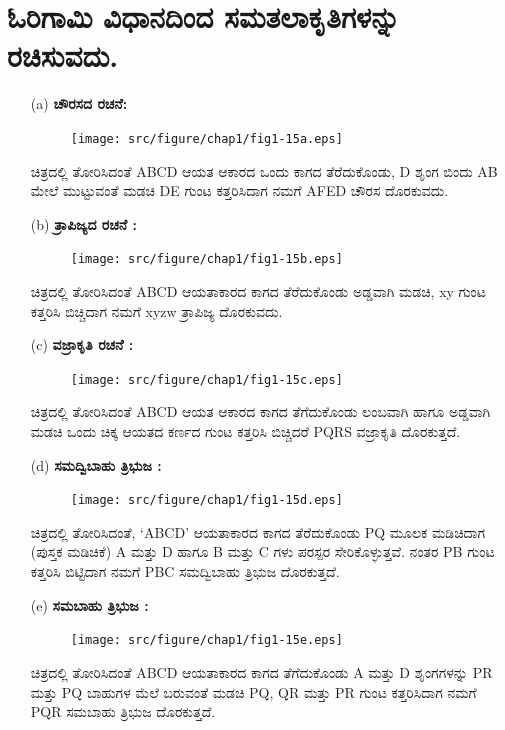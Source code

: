 \section{ಓರಿಗಾಮಿ ವಿಧಾನದಿಂದ ಸಮತಲಾಕೃತಿಗಳನ್ನು ರಚಿಸುವದು.}\label{sec1.9} %
\begin{itemize}
\item[(a)] \textbf{ಚೌರಸದ ರಚನೆ:}
\begin{figure}[H]
\centering
\texttt{[image: src/figure/chap1/fig1-15a.eps]}
\end{figure}

ಚಿತ್ರದಲ್ಲಿ ತೋರಿಸಿದಂತೆ ABCD ಆಯತ ಆಕಾರದ ಒಂದು ಕಾಗದ ತೆರೆದುಕೊಂಡು, D ಶೃಂಗ ಬಿಂದು AB ಮೇಲೆ ಮುಟ್ಟುವಂತೆ ಮಡಚಿ DE ಗುಂಟ ಕತ್ತರಿಸಿದಾಗ ನಮಗೆ  AFED ಚೌರಸ ದೊರಕುವದು. 


\item[(b)] \textbf{ತ್ರಾಪಿಜ್ಯದ ರಚನೆ :}
\begin{figure}[H]
\centering
\texttt{[image: src/figure/chap1/fig1-15b.eps]}
\end{figure}

ಚಿತ್ರದಲ್ಲಿ ತೋರಿಸಿದಂತೆ ABCD ಆಯತಾಕಾರದ ಕಾಗದ ತೆರೆದುಕೊಂಡು ಅಡ್ಡವಾಗಿ ಮಡಚಿ, xy ಗುಂಟ ಕತ್ತರಿಸಿ ಬಿಚ್ಚಿದಾಗ ನಮಗೆ xyzw ತ್ರಾಪಿಜ್ಯ ದೊರಕುವದು. 

\item[(c)] \textbf{ವಜ್ರಾಕೃತಿ ರಚನೆ :}
\begin{figure}[H]
\centering
\texttt{[image: src/figure/chap1/fig1-15c.eps]}
\end{figure}

ಚಿತ್ರದಲ್ಲಿ ತೋರಿಸಿದಂತೆ  ABCD ಆಯತ ಆಕಾರದ ಕಾಗದ ತೆಗೆದುಕೊಂಡು ಲಂಬವಾಗಿ ಹಾಗೂ ಅಡ್ಡವಾಗಿ ಮಡಚಿ ಒಂದು ಚಿಕ್ಕ ಆಯತದ ಕರ್ಣದ ಗುಂಟ ಕತ್ತರಿಸಿ ಬಿಚ್ಚಿದರೆ PQRS ವಜ್ರಾಕೃತಿ ದೊರಕುತ್ತದೆ. 

\item[(d)] \textbf{ಸಮದ್ವಿಬಾಹು ತ್ರಿಭುಜ :}
\begin{figure}[H]
\centering
\texttt{[image: src/figure/chap1/fig1-15d.eps]}
\end{figure}

ಚಿತ್ರದಲ್ಲಿ ತೋರಿಸಿದಂತೆ, `ABCD' ಆಯತಾಕಾರದ ಕಾಗದ ತೆರೆದುಕೊಂಡು PQ ಮೂಲಕ ಮಡಿಚಿದಾಗ (ಪುಸ್ತಕ ಮಡಿಚಿಕೆ) A ಮತ್ತು D ಹಾಗೂ  B ಮತ್ತು  C ಗಳು ಪರಸ್ಪರ ಸೇರಿಕೊಳ್ಳುತ್ತವೆ. ನಂತರ PB ಗುಂಟ ಕತ್ತರಿಸಿ ಬಿಟ್ಟಿದಾಗ ನಮಗೆ  PBC ಸಮದ್ವಿಬಾಹು ತ್ರಿಭುಜ ದೊರಕುತ್ತದೆ. 


\item[(e)] \textbf{ಸಮಬಾಹು ತ್ರಿಭುಜ : }
\begin{figure}[H]
\centering
\texttt{[image: src/figure/chap1/fig1-15e.eps]}
\end{figure}

ಚಿತ್ರದಲ್ಲಿ ತೋರಿಸಿದಂತೆ ABCD ಆಯತಾಕಾರದ ಕಾಗದ ತೆಗೆದುಕೊಂಡು A ಮತ್ತು  D ಶೃಂಗಗಳನ್ನು PR ಮತ್ತು PQ  ಬಾಹುಗಳ ಮೆಲೆ ಬರುವಂತೆ ಮಡಚಿ  PQ, QR ಮತ್ತು PR ಗುಂಟ ಕತ್ತರಿಸಿದಾಗ ನಮಗೆ PQR ಸಮಬಾಹು ತ್ರಿಭುಜ ದೊರಕುತ್ತದೆ. 
\end{itemize}

